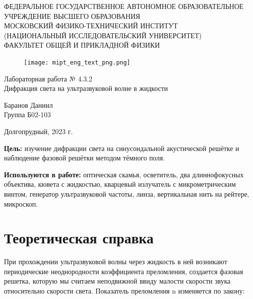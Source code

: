\documentclass[a4paper,12pt]{article} %
\begin{document}
\begin{center}
	\footnotesize{ФЕДЕРАЛЬНОЕ ГОСУДАРСТВЕННОЕ АВТОНОМНОЕ ОБРАЗОВАТЕЛЬНОЕ 			УЧРЕЖДЕНИЕ ВЫСШЕГО ОБРАЗОВАНИЯ}\\
	\footnotesize{МОСКОВСКИЙ ФИЗИКО-ТЕХНИЧЕСКИЙ ИНСТИТУТ\\(НАЦИОНАЛЬНЫЙ 			ИССЛЕДОВАТЕЛЬСКИЙ УНИВЕРСИТЕТ)}\\
	\footnotesize{ФАКУЛЬТЕТ ОБЩЕЙ И ПРИКЛАДНОЙ ФИЗИКИ\\}
	\hfill \break
	\hfill \break
	\hfill \break
	\hfill \break
\end{center}


\begin{figure}[h]
    \centering
    \texttt{[image: mipt\_eng\_text\_png.png]}
    \label{fig:my_label}
\end{figure}


\begin{center}   
    \hfill \break
	\hfill \break
	\hfill \break
	\large{Лабораторная работа № 4.3.2\\ \hfill \break\Large{Дифракция света на ультразвуковой волне в жидкости}}\\
	\hfill \break
	\hfill \break
	\hfill \break
	\hfill \break
	\begin{flushright}
		Баранов Даниил\\
		Группа Б02-103
	\end{flushright}
	\hfill \break
	\hfill \break
	\hfill \break
\end{center}
\hfill \break
\hfill \break
\hfill \break
\hfill \break
\begin{center}
	Долгопрудный, 2023 г.
\end{center}
\thispagestyle{empty}

\newpage


\textbf{Цель:} изучение дифракции света на синусоидальной акустической решётке и наблюдение фазовой решётки методом тёмного
поля.

\textbf{Используются в работе:} оптическая скамья, осветитель, два длиннофокусных объектива, кювета с жидкостью, кварцевый излучатель
с микрометрическим винтом, генератор ультразвуковой частоты, линза, вертикальная нить на рейтере, микроскоп.

\section{Теоретическая справка}
При прохождении ультразвуковой волны через жидкость в ней возникают периодические неоднородности коэффициента преломления, создается фазовая решетка, которую мы считаем неподвижной ввиду малости скорости звука относительно скорости света. Показатель
	преломления n изменяется по закону:
	
\end{document}
